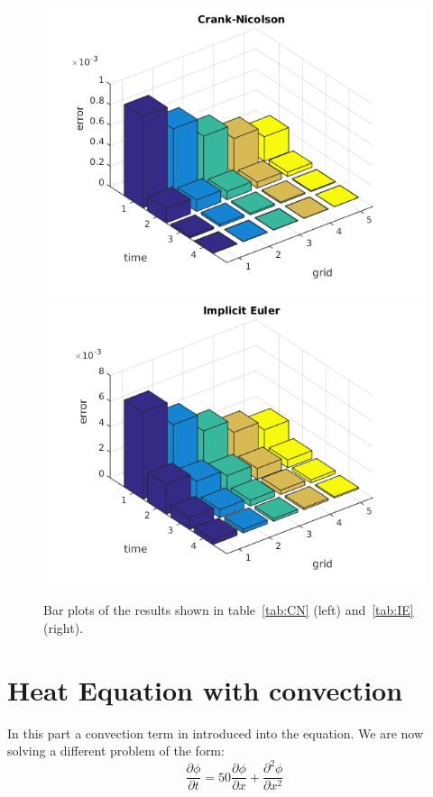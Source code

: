 \documentclass[ twoside,openright,titlepage,numbers=noenddot,headinclude,%
                footinclude=true,cleardoublepage=empty,abstractoff, %
                BCOR=5mm,paper=a4,fontsize=11pt,%
                ngerman,american,%
                ]{scrreprt}
\begin{document}
\begin{figure}
\includegraphics[scale = 0.45]{images/q2CN.png}
\includegraphics[scale = 0.45]{images/q2IE.png}
\caption{Bar plots of the results shown in table~\ref{tab:CN} (left) and~\ref{tab:IE} (right).}
\label{fig:bar}
\end{figure}

\chapter{Heat Equation with convection}
In this part a convection term in introduced into the equation. We are now solving a different problem of the form:
\begin{equation}
\frac{\partial \phi}{\partial t} = 50\frac{\partial \phi}{\partial x} + \frac{\partial^2 \phi}{\partial x^2}
\end{equation}
\end{document}
